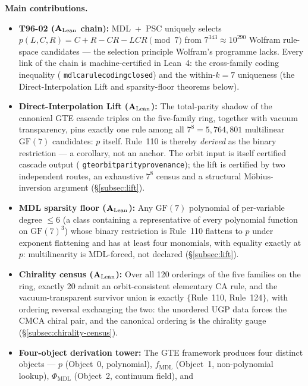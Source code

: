 \documentclass[11pt]{article}
\theoremstyle{remark}
\newcommand{\PHIMDL}{\ensuremath{\Phi_{\mathrm{MDL}}}}
\newcommand{\GF}[1]{\ensuremath{\mathrm{GF}(#1)}}
\newcommand{\lean}[1]{%
  \penalty-100
  \begingroup\def\_{\textunderscore\allowbreak}\texttt{#1}\endgroup}
\newcommand{\fmdl}{\ensuremath{f_{\mathrm{MDL}}}}
\newcommand{\CatAL}{\texorpdfstring{\ensuremath{\textbf{A}_{\rm Lean}}}{A-Lean}}
\begin{document}
\medskip
\noindent\textbf{Main contributions.}
\begin{itemize}[leftmargin=2em,itemsep=2pt,topsep=4pt]
  \item \textbf{T96-02 (\CatAL{} chain):} MDL~+~PSC uniquely selects
        $p(L,C,R) = C+R-CR-LCR \pmod{7}$ from $7^{343} \approx
        10^{290}$ Wolfram rule-space candidates --- the selection principle
        Wolfram's programme lacks. Every link of the chain is machine-certified
        in Lean~4: the cross-family coding inequality
        (\lean{mdl\_ca\_rule\_coding\_closed}) and the within-$k{=}7$
        uniqueness (the Direct-Interpolation Lift and sparsity-floor theorems
        below).
  \item \textbf{Direct-Interpolation Lift (\CatAL{}):} The total-parity
        shadow of the canonical GTE cascade triples on the five-family ring,
        together with vacuum transparency, pins exactly one rule among all
        $7^{8} = 5{,}764{,}801$ multilinear $\GF{7}$ candidates: $p$ itself.
        Rule~110 is thereby \emph{derived} as the binary restriction --- a
        corollary, not an anchor. The orbit input is itself certified cascade
        output (\lean{gte\_orbit\_parity\_provenance}); the lift is certified
        by two independent routes, an exhaustive $7^{8}$ census and a
        structural M\"obius-inversion argument (§\ref{subsec:lift}).
  \item \textbf{MDL sparsity floor (\CatAL{}):} Any $\GF{7}$ polynomial of
        per-variable degree ${\leq}6$ (a class containing a representative of
        every polynomial function on $\GF{7}^3$) whose binary restriction is
        Rule~110 flattens to $p$ under exponent flattening and has at least
        four monomials, with equality exactly at $p$: multilinearity is
        MDL-forced, not declared (§\ref{subsec:lift}).
  \item \textbf{Chirality census (\CatAL{}):} Over all 120 orderings of the
        five families on the ring, exactly 20 admit an orbit-consistent
        elementary CA rule, and the vacuum-transparent survivor union is
        exactly $\{$Rule~110, Rule~124$\}$, with ordering reversal exchanging
        the two: the unordered UGP data forces the CMCA chiral pair, and the
        canonical ordering is the chirality gauge
        (§\ref{subsec:chirality-census}).
  \item \textbf{Four-object derivation tower:} The GTE framework produces four
        distinct objects --- $p$ (Object~0, polynomial), $\fmdl{}$ (Object~1,
        non-polynomial lookup), $\PHIMDL{}$ (Object~2, continuum field), and

\end{itemize}
\end{document}
